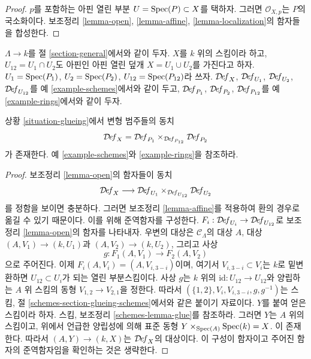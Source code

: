 \begin{proof}
$p$를 포함하는 아핀 열린 부분 $U = \mathop{\mathrm{Spec}}(P) \subset X$를 택하자.
그러면 $\mathcal{O}_{X, p}$는 $P$의 국소화이다. 보조정리
\ref{lemma-open}, \ref{lemma-affine}, \ref{lemma-localization}의 함자들을
합성한다.
\end{proof}

\begin{situation}
\label{situation-glueing}
$\Lambda \to k$를 절 \ref{section-general}에서와 같이 두자. $X$를
$k$ 위의 스킴이라 하고, $U_{12} = U_1 \cap U_2$도 아핀인 아핀 열린 덮개
$X = U_1 \cup U_2$를 가진다고 하자. $U_1 = \mathop{\mathrm{Spec}}(P_1)$,
$U_2 = \mathop{\mathrm{Spec}}(P_2)$, $U_{12} = \mathop{\mathrm{Spec}}(P_{12})$라 쓰자.
$\mathcal{D}\!\mathit{ef}_X$, $\mathcal{D}\!\mathit{ef}_{U_1}$,
$\mathcal{D}\!\mathit{ef}_{U_2}$, $\mathcal{D}\!\mathit{ef}_{U_{12}}$를 예
\ref{example-schemes}에서와 같이 두고, $\mathcal{D}\!\mathit{ef}_{P_1}$,
$\mathcal{D}\!\mathit{ef}_{P_2}$, $\mathcal{D}\!\mathit{ef}_{P_{12}}$를 예
\ref{example-rings}에서와 같이 두자.
\end{situation}

\begin{lemma}
\label{lemma-glueing}
상황 \ref{situation-glueing}에서 변형 범주들의 동치
$$
\mathcal{D}\!\mathit{ef}_X =
\mathcal{D}\!\mathit{ef}_{P_1}
\times_{\mathcal{D}\!\mathit{ef}_{P_{12}}}
\mathcal{D}\!\mathit{ef}_{P_2}
$$
가 존재한다. 예 \ref{example-schemes}와 \ref{example-rings}을 참조하라.
\end{lemma}

\begin{proof}
보조정리 \ref{lemma-open}의 함자들이 동치
$$
\mathcal{D}\!\mathit{ef}_X \longrightarrow
\mathcal{D}\!\mathit{ef}_{U_1}
\times_{\mathcal{D}\!\mathit{ef}_{U_{12}}}
\mathcal{D}\!\mathit{ef}_{U_2}
$$
를 정함을 보이면 충분하다. 그러면 보조정리 \ref{lemma-affine}를 적용하여
환의 경우로 옮길 수 있기 때문이다. 이를 위해 준역함자를 구성한다.
$F_i : \mathcal{D}\!\mathit{ef}_{U_i} \to \mathcal{D}\!\mathit{ef}_{U_{12}}$로
보조정리 \ref{lemma-open}의 함자를 나타내자. 우변의 대상은
$\mathcal{C}_\Lambda$의 대상 $A$, 대상 $(A, V_1) \to (k, U_1)$과
$(A, V_2) \to (k, U_2)$, 그리고 사상
$$
g : F_1(A, V_1) \to F_2(A, V_2)
$$
으로 주어진다. 이제 $F_i(A, V_i) = (A, V_{i, 3 - i})$이며, 여기서
$V_{i, 3 - i} \subset V_i$는 $k$로 밑변환하면
$U_{12} \subset U_i$가 되는 열린 부분스킴이다. 사상 $g$는 $k$ 위의
$\text{id} : U_{12} \to U_{12}$와 양립하는 $A$ 위 스킴의 동형
$V_{1, 2} \to V_{2, 1}$을 정한다. 따라서
$(\{1, 2\}, V_i, V_{i, 3 - i}, g, g^{-1})$는 스킴, 절
\ref{schemes-section-glueing-schemes}에서와 같은 붙이기 자료이다.
$Y$를 붙여 얻은 스킴이라 하자. 스킴, 보조정리
\ref{schemes-lemma-glue}를 참조하라. 그러면 $Y$는 $A$ 위의 스킴이고,
위에서 언급한 양립성에 의해 표준 동형
$Y \times_{\mathop{\mathrm{Spec}}(A)} \mathop{\mathrm{Spec}}(k) = X$.
이 존재한다. 따라서 $(A, Y) \to (k, X)$는
$\mathcal{D}\!\mathit{ef}_X$의 대상이다. 이 구성이 함자이고 주어진 함자의
준역함자임을 확인하는 것은 생략한다.
\end{proof}







